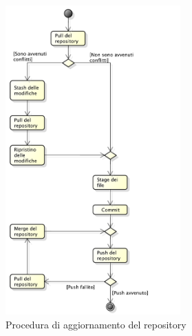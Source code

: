 					\begin{figure}[H]
						\centering
						\includegraphics[width=0.6\textwidth]{NormeDiProgetto/Pics/Commit}
						\caption{Procedura di aggiornamento del repository}
					\end{figure}


